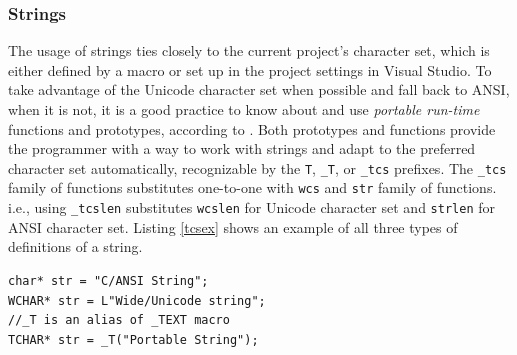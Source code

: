 \subsubsection{Strings}
The usage of strings ties closely to the current project's character set, which is either defined by a macro or set up in the project settings in Visual Studio. To take advantage of the Unicode character set when possible and fall back to ANSI, when it is not, it is a good practice to know about and use \textit{portable run-time} functions and prototypes, according to \cite{WinUnicodeSummary}. Both prototypes and functions provide the programmer with a way to work with strings and adapt to the preferred character set automatically, recognizable by the \lstinline{T}, \lstinline{_T}, or \lstinline{_tcs} prefixes. The \lstinline{_tcs} family of functions substitutes one-to-one with \lstinline{wcs} and \lstinline{str} family of functions. i.e., using \lstinline{_tcslen} substitutes \lstinline{wcslen} for Unicode character set and \lstinline{strlen} for ANSI character set. Listing \ref{tcsex} shows an example of all three types of definitions of a string.
\begin{lstlisting}[caption={An example of defining static strings}, label=tcsex]
char* str = "C/ANSI String";
WCHAR* str = L"Wide/Unicode string";
//_T is an alias of _TEXT macro
TCHAR* str = _T("Portable String");
\end{lstlisting}


